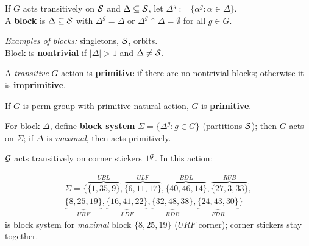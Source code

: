 \begin{slide}
    \begin{definition}[block]
        \vspace{0pt}
        If $G$ acts transitively on $\mathcal{S}$ and $\Delta \subseteq \mathcal{S}$, let $\Delta^g := \{\alpha^g : \alpha \in \Delta\}$. \\
        A \textbf{block} is $\Delta \subseteq \mathcal{S}$ with $\Delta^g = \Delta$ or $\Delta^g \cap \Delta = \emptyset$ for all $g \in G$. \pause
    \end{definition}

    \textit{Examples of blocks:} singletons, $\mathcal{S}$, orbits. \\
    Block is \textbf{nontrivial} if $|\Delta| > 1$ and $\Delta \neq \mathcal{S}$. \pause

    \begin{definition}[primitivity]
        \vspace{0pt}
        A \textit{transitive} $G$-action is \textbf{primitive} if there are no nontrivial blocks; otherwise it is \textbf{imprimitive}.

        If $G$ is perm group with primitive natural action, $G$ is \textbf{primitive}.
    \end{definition} \pause

    For block $\Delta$, define \textbf{block system} $\Sigma = \{\Delta^g : g \in G\}$ (partitions $\mathcal{S}$); then $G$ acts on $\Sigma$; if $\Delta$ is \textit{maximal}, then acts primitively.
\end{slide}

\begin{slide}
    $\mathcal{G}$ acts transitively on corner stickers $1^{\mathcal{G}}$. In this action:

    \begin{center}
    \end{center} \pause

    \vspace{-1cm}
    \begin{multline*}
        \Sigma = \{\overbrace{\{1,35,9\}}^{UBL},\overbrace{\{6,11,17\}}^{ULF},\overbrace{\{40,46,14\}}^{BDL},\overbrace{\{27,3,33\}}^{RUB},\\
        \underbrace{\{8,25,19\}}_{URF},\underbrace{\{16,41,22\}}_{LDF},\underbrace{\{32,48,38\}}_{RDB},\underbrace{\{24,43,30\}}_{FDR}\}
    \end{multline*}
    is block system for \textit{maximal} block $\{8,25,19\}$ ($URF$ corner); corner stickers stay together.
\end{slide}

